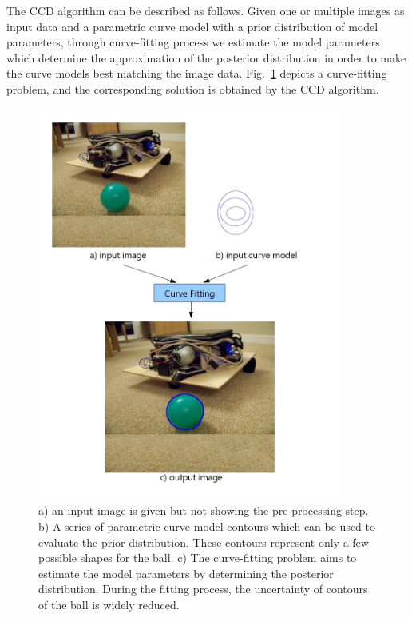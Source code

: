 The CCD algorithm can be described as follows. Given one or multiple images as input
data and a parametric curve model with a prior distribution of model
parameters, through curve-fitting process we estimate the model
parameters which determine the approximation of the posterior
distribution in order to make the curve models best matching the image data.
Fig.~\ref{fig:fitting} depicts a curve-fitting problem, and the corresponding solution is obtained by the
CCD algorithm.
\begin{figure}[htb]
  \centering
  \includegraphics[width=10cm]{images/fitting.jpg}
  \caption[The description of curve-fitting problem]{a) an input
    image is given but not showing the pre-processing step. b) A series of
    parametric curve model contours which can be used to evaluate the
    prior distribution. These contours represent only a few possible
    shapes for the ball. c) The curve-fitting problem aims to estimate the model
    parameters by determining the posterior distribution. During the
    fitting process, the uncertainty of contours of the ball is widely
    reduced.}
  \label{fig:fitting}
\end{figure}

